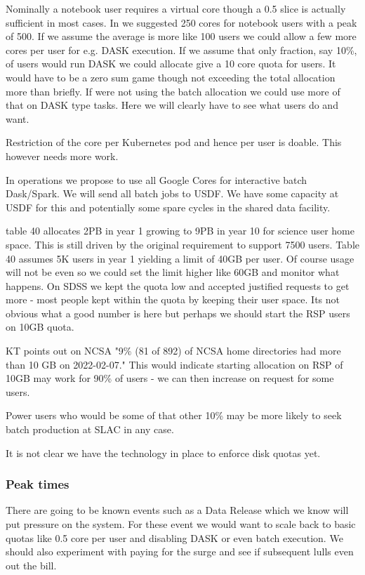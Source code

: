 Nominally a notebook user requires a virtual core though a 0.5 slice is actually sufficient in most cases.
In  we suggested 250 cores for notebook users with a peak of 500. If we assume the average is more like 100 users we could allow a few more cores per user for e.g. DASK execution. If we assume that only  fraction, say 10\%,  of users would run DASK we could allocate give a 10 core quota for users.
It would have to be a zero sum game though not exceeding the total allocation more than briefly.
If were not using the batch allocation we could use more of that on DASK type tasks.
Here we will clearly have to see what users do and want.

Restriction of the core per Kubernetes pod and hence per user is doable.
This however needs more work.


In operations we propose to use all Google Cores for interactive batch Dask/Spark.
We will  send all batch jobs to USDF. We have some capacity at USDF for this and potentially some spare cycles in the shared data facility.

 table 40 allocates 2PB in year 1 growing to 9PB in year 10 for science user home space.
This is still driven by the original requirement to support 7500 users. Table 40 assumes 5K users in year 1
yielding a limit of 40GB per user. Of course usage will not be even so we could set the limit higher like 60GB
and monitor what happens. On SDSS we kept the quota low and accepted justified requests to get more - most people kept within the quota by keeping their user space. Its not obvious what a good number is here but perhaps we should start the RSP users on 10GB quota.

KT points out on NCSA "9\% (81 of 892) of NCSA home directories had more than 10 GB on 2022-02-07."
This would indicate  starting allocation on RSP of 10GB may work for 90\% of  users - we can then increase on request for some users.

Power users who would be some of that other 10\% may be more likely to seek batch production at SLAC in any case.



It is not clear we have the technology in place to enforce disk quotas yet.

\subsubsection{Peak times}
There are going to be known events such as a Data Release which we know will put pressure on the system.
For these event we would want to scale back to basic quotas like 0.5 core per user  and disabling DASK or even batch execution.
We should also experiment with paying for the surge and see if subsequent lulls even out the bill.

